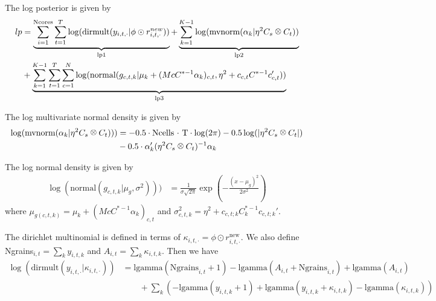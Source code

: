 \documentclass[12pt]{article}
\newcommand{\kron}{\raisebox{1pt}{\ensuremath{\:\otimes\:}}}
\newcommand{\lgamma}{\text{lgamma}}
\begin{document}
The log posterior is given by
\begin{align*}
  lp &= \underbrace{\sum_{i=1}^{\text{Ncores}} \sum_{t=1}^{T} \log(\text{dirmult}(y_{i,t,\cdot}| \phi \odot r^{new}_{i,t, \cdot}))}_{\text{lp1}} +
  \underbrace{\sum_{k=1}^{K-1}\log(\text{mvnorm}(\alpha_k| \eta^2 C_s \kron C_t))}_{\text{lp2}} \\& +
  \underbrace{\sum_{k=1}^{K-1}\sum_{t=1}^{T}\sum_{c=1}^{N}\log(\text{normal}(g_{c,t,k}| \mu_k + (McC^{*-1}\alpha_{k})_{c,t}, \eta^2 + c_{c,t}C^{*-1}c_{c,t}'))}_{\text{lp3}}
\end{align*}

The log multivariate normal density is given by
\begin{align*}
  \log(\text{mvnorm}(\alpha_k| \eta^2 C_s \kron C_t))) &= - 0.5 \cdot \text{Ncells $\cdot$ T} \cdot
  \log(2 \pi) -0.5 \log(|\eta^2 C_s \kron C_t|) \\ \qquad & - 0.5 \cdot \alpha_k'(\eta^2 C_s \kron C_t)^{-1} \alpha_k \\
\end{align*}

The log normal density is given by
\begin{align*}
  \log(\text{normal}(g_{c,t,k}| \mu_g, \sigma^2))) &= \frac{1}{\sigma\sqrt{2\pi}} \exp\left(-\frac{(x-\mu_g)^2}{2\sigma^2}\right)
\end{align*}
where $\mu_{g (c,t,k)} = \mu_k + \left(McC^{*-1}\alpha_{k}\right)_{c,t}$ and $\sigma^2_{c,t,k}=\eta^2 + c_{c,t;k} C^{*-1}_k c_{c,t;k}'$.


The dirichlet multinomial is defined in terms of $\kappa_{i,t,\cdot} = \phi \odot r^{\text{new}}_{i,t,\cdot}$. We also define Ngrains$_{i,t}=\sum_k y_{i,t,k}$ and $A_{i,t}= \sum_k \kappa_{i,t,k}$. Then we have
\begin{align*}
  \log(\text{dirmult}(y_{i,t,\cdot}| \kappa_{i,t,\cdot}))
    &= \lgamma (\text{Ngrains}_{i,t} + 1 ) - \lgamma(A_{i,t} + \text{Ngrains}_{i,t}) + \lgamma(A_{i,t})  \\
    & \qquad + \sum_k \left( - \lgamma(y_{i,t,k} + 1) + \lgamma(y_{i,t,k} + \kappa_{i,t,k}) - \lgamma(\kappa_{i,t,k})\right)
\end{align*}
\end{document}
